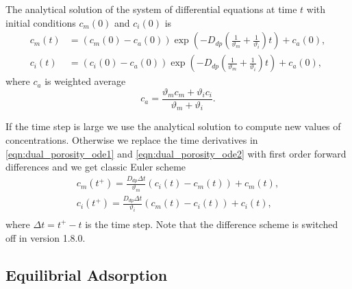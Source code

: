 The analytical solution of the system of differential equations at time $t$ with initial conditions $c_m(0)$ and $c_i(0)$ is
\begin{align}
     c_m(t) &= (c_m(0) - c_a(0)) \exp\left(- D_{dp}\left(\frac{1}{\vartheta_m} + \frac{1}{\vartheta_i}\right) t \right) + c_a(0), \\
     c_i(t) &= (c_i(0) - c_a(0)) \exp\left(- D_{dp}\left(\frac{1}{\vartheta_m} + \frac{1}{\vartheta_i}\right) t \right) + c_a(0),
\end{align}
where $c_a$ is weighted average
\[
  c_a = \frac{\vartheta_m c_m + \vartheta_i c_i}{\vartheta_m + \vartheta_i}.
\]

If the time step is large we use the analytical solution to compute new values of concentrations. 
Otherwise we replace the time derivatives in \eqref{eqn:dual_porosity_ode1} and \eqref{eqn:dual_porosity_ode2} 
with first order forward differences and we get classic Euler scheme
\begin{align}
  c_m(t^+) = \frac{D_{dp} \Delta t}{\vartheta_m}(c_i(t) - c_m(t)) + c_m(t), \\
  c_i(t^+) = \frac{D_{dp} \Delta t}{\vartheta_i}(c_m(t) - c_i(t)) + c_i(t), \\
\end{align}
where $\Delta t = t^+ - t$ is the time step. Note that the difference scheme is switched off in version 1.8.0.

\subsection{Equilibrial Adsorption}
\label{sec:sorp_math}

